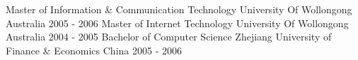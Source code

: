 
\begin{cventries}
  \cventry
  {Master of Information \& Communication Technology} %
  {University Of Wollongong} %
  {Australia} %
  {2005 - 2006} %
  {}
  \cventry
  {Master of Internet Technology} %
  {University Of Wollongong} %
  {Australia} %
  {2004 - 2005} %
  {}
  \cventry
  {Bachelor of Computer Science} %
  {Zhejiang University of Finance \& Economics} %
  {China} %
  {2005 - 2006} %
  {}
\end{cventries}